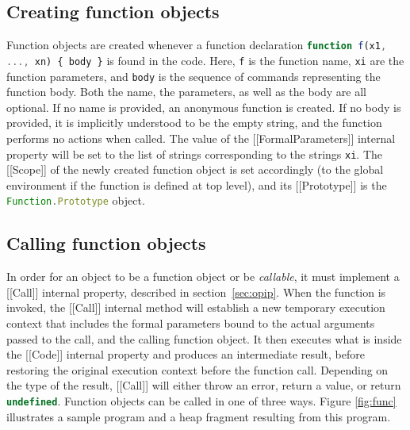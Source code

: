 \documentclass[a4paper,11pt,twoside]{report}
\def\jsinline{\lstinline[language=JavaScript, basicstyle=\small]}%\end{lstlisting}
\begin{document}
\subsection{Creating function objects}
Function objects are created whenever a function declaration \jsinline|function f(x1, ..., xn) { body }| is found in the code. 
Here, \jsinline|f| is the function name, \jsinline|xi| are the function parameters, and \jsinline|body| is the sequence of commands
representing the function body. Both the name, the parameters, as well as the body are all optional. If no name is provided,
an anonymous function is created. If no body is provided,
it is implicitly understood to be the empty string, and the function performs no actions when called.
The value of the [[FormalParameters]] internal property will be set to the list of strings corresponding to the strings \jsinline|xi|. 
The [[Scope]] of the newly created function object is set accordingly (to the global environment if the function is defined at top level), 
and its [[Prototype]] is the \jsinline|Function.Prototype| object.

\subsection{Calling function objects}
In order for an object to be a function object or be \emph{callable}, it must implement a [[Call]] internal property, described in section~\ref{sec:opip}. When the function is invoked, the [[Call]] internal method will establish a new temporary execution context that includes the formal parameters bound to the actual arguments passed to the call, and the calling function object. It then executes what is inside the [[Code]] internal property and produces an intermediate result, before restoring the original execution context before the function call. Depending on the type of the result, [[Call]] will either throw an error, return a value, or return \jsinline|undefined|. Function objects can be called in one of three ways. Figure \ref{fig:func} illustrates a sample program and a heap fragment resulting from this program.
\end{document}
